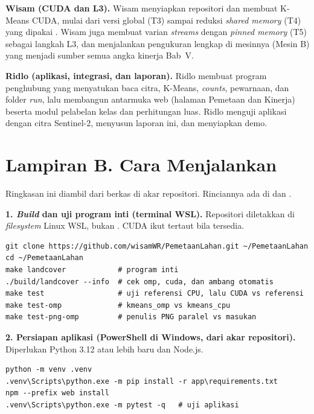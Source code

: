 \textbf{Wisam (CUDA dan L3).} Wisam menyiapkan repositori dan membuat K-Means CUDA, mulai dari versi  global (T3) sampai reduksi \emph{shared memory} (T4) yang dipakai . Wisam juga membuat varian \emph{streams} dengan \emph{pinned memory} (T5) sebagai langkah L3, dan menjalankan pengukuran lengkap di mesinnya (Mesin B) yang menjadi sumber semua angka kinerja Bab~V.

\textbf{Ridlo (aplikasi, integrasi, dan laporan).} Ridlo membuat program penghubung  yang menyatukan baca citra, K-Means, \emph{counts}, pewarnaan, dan folder \emph{run}, lalu membangun antarmuka web (halaman Pemetaan dan Kinerja) beserta modul pelabelan kelas dan perhitungan luas. Ridlo menguji aplikasi dengan citra Sentinel-2, menyusun laporan ini, dan menyiapkan demo.

\section*{Lampiran B. Cara Menjalankan}
Ringkasan ini diambil dari berkas  di akar repositori. Rinciannya ada di  dan .

\textbf{1. \emph{Build} dan uji program inti (terminal WSL).} Repositori diletakkan di \emph{filesystem} Linux WSL, bukan . CUDA ikut tertaut bila  tersedia.
\begin{lstlisting}[style=perintah]
git clone https://github.com/wisamWR/PemetaanLahan.git ~/PemetaanLahan
cd ~/PemetaanLahan
make landcover            # program inti
./build/landcover --info  # cek omp, cuda, dan ambang otomatis
make test                 # uji referensi CPU, lalu CUDA vs referensi
make test-omp             # kmeans_omp vs kmeans_cpu
make test-png-omp         # penulis PNG paralel vs masukan
\end{lstlisting}

\textbf{2. Persiapan aplikasi (PowerShell di Windows, dari akar repositori).} Diperlukan Python 3.12 atau lebih baru dan Node.js.
\begin{lstlisting}[style=perintah]
python -m venv .venv
.venv\Scripts\python.exe -m pip install -r app\requirements.txt
npm --prefix web install
.venv\Scripts\python.exe -m pytest -q   # uji aplikasi
\end{lstlisting}

